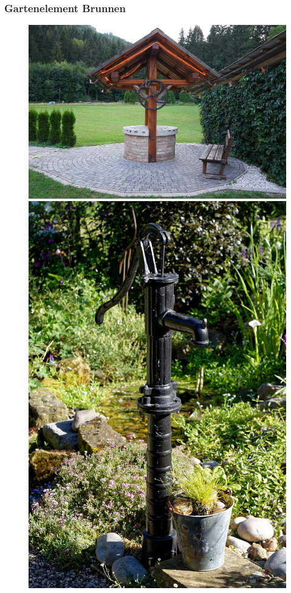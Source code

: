 \subsubsection{Gartenelement Brunnen}
\begin{figure}[!htb]
	\centering
	\includegraphics[height=0.32\textheight]{images/Ziehbrunnen.jpg}
	\includegraphics[height=0.32\textheight]{images/Handpumpe.jpg}

\end{figure}
